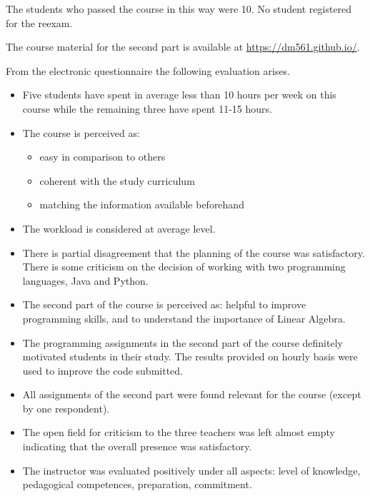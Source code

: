 \documentclass[11pt]{article}
\begin{document}
The students who passed the course in this way were 10. No student
registered for the reexam.

The course material for the second part is available at
\url{https://dm561.github.io/}.




\medskip

From the electronic questionnaire the following evaluation arises.

\begin{itemize}
\item Five students have spent in average less than 10 hours per week on
  this course while the remaining three have spent 11-15 hours.

\item The course is perceived as:

\begin{itemize}
\item  easy in comparison to others
\item  coherent with the study curriculum
\item matching the information available beforehand
\end{itemize}

\item The workload is considered at average level.

\item There is partial disagreement that the planning of the course was
  satisfactory. There is some criticism on the decision of working with
  two programming languages, Java and Python.

\item The second part of the course is perceived as:
 helpful to improve programming skills,
and to understand the importance of Linear Algebra.

\item The programming assignments in the second part of the course
  definitely motivated students in their study. The results provided on
  hourly basis were used to improve the code submitted.

\item All assignments of the second part were found relevant for the
  course (except by one respondent).

\item The open field for criticism to the three teachers was left almost
  empty indicating that the overall presence was satisfactory.
  
\item The instructor was evaluated positively under all aspects: level
  of knowledge, pedagogical competences, preparation, commitment.

\end{itemize}
  
\end{document}
